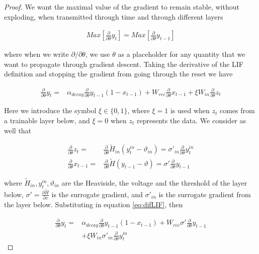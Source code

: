 \begin{proof}


We want the maximal value of the gradient to remain stable, without exploding, when transmitted through time and through different layers


\begin{align}
    Max[\frac{\partial}{\partial \theta}y_t] = Max[\frac{\partial}{\partial \theta}y_{t-1}]
\end{align}

\noindent where when we write $\partial/\partial \theta$, we use $\theta$ as a placeholder for any quantity that we want to propagate through gradient descent.
Taking the derivative of the LIF definition and stopping the gradient from going through the reset we have 

\begin{align}\label{eq:difLIF}
    \frac{\partial}{\partial \theta}y_t =& \alpha_{decay} \frac{\partial}{\partial \theta}y_{t-1}(1-x_{t-1}) + W_{rec}\frac{\partial}{\partial \theta}x_{t-1} + \xi W_{in}\frac{\partial}{\partial \theta}z_{t} 
\end{align}

Here we introduce the symbol $\xi\in \{0,1\}$, where $\xi=1$ is used when $z_t$ comes from a trainable layer below, and $\xi=0$ when $z_t$ represents the data. We consider as well that


\begin{align}
    \frac{\partial}{\partial \theta}z_{t} =& \frac{\partial}{\partial \theta}\tilde{H}_{in}(y_{t}^{in}-\vartheta_{in})= \sigma'_{in}\frac{\partial}{\partial \theta}y_{t}^{in} \\
    \frac{\partial}{\partial \theta}x_{t-1} =& \frac{\partial}{\partial \theta}\tilde{H}(y_{t-1}-\vartheta)=\sigma'\frac{\partial}{\partial \theta}y_{t-1}
\end{align}

\noindent where  $\tilde{H}_{in},y_{t}^{in},\vartheta_{in}$ are the Heaviside, the voltage and the threshold of the layer below, $\sigma'=\frac{\partial\tilde{H}}{\partial v}$ is the surrogate gradient, and $\sigma'_{in}$ is the surrogate gradient from the layer below. Substituting in equation \ref{eq:difLIF}, then

\begin{align}
    \frac{\partial}{\partial \theta}y_t =& \alpha_{decay} \frac{\partial}{\partial \theta}y_{t-1}(1-x_{t-1}) + W_{rec}\sigma'\frac{\partial}{\partial \theta}y_{t-1} \\
    &+ \xi W_{in}\sigma'_{in}\frac{\partial}{\partial \theta}y_{t}^{in}  \label{appeq:derivativelif}
\end{align}


\end{proof}
